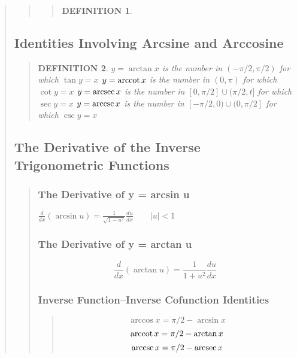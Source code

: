 \documentclass{report}
\newtheorem*{definition}{DEFINITION}
\begin{document}
\begin{quote}
\begin{quote}
\begin{quote}
\begin{definition}
		\end{definition}
		\end{quote}

	\end{quote}

	\subsection{Identities Involving Arcsine and Arccosine	}
	\begin{quote}

		\begin{definition}
			$y = \arctan x$ is the number in $(-\pi/2,\pi/2)$ for which $\tan y = x$
			$y = \arccot x$ is the number in $(0,\pi)$ for which $\cot y = x$
			$y = \arcsec x$ is the number in $[0, \pi/2] \cup (\pi / 2,t]$ for which $\sec y = x$
			$y = \arccsc x$ is the number in $[-\pi/2,0) \cup (0,\pi/2]$ for which $\csc y = x$
		\end{definition}

	\end{quote}

	\subsection{The Derivative of the Inverse Trigonometric Functions}
	\begin{quote}

		\subsubsection{The Derivative of y = arcsin u}
		\begin{center}
			$\frac{d}{dx}(\arcsin u)= \frac{1}{\sqrt{1-u^2}} \frac{du}{dx}\qquad \left | u \right |<1$
		\end{center}

		\subsubsection{The Derivative of y = arctan u }
			$$\frac{d}{dx}(\arctan u) = \frac{1}{1+u^2} \frac{du}{dx}$$

		\subsubsection{Inverse Function–Inverse Cofunction Identities}
		\begin{quote}
			$$\arccos x = \pi/2 - \arcsin x$$
			$$\arccot x = \pi/2 - \arctan x$$
			$$\arccsc x = \pi/2 - \arcsec x$$
		\end{quote}
	
	\end{quote}

\end{quote}
\end{document}
